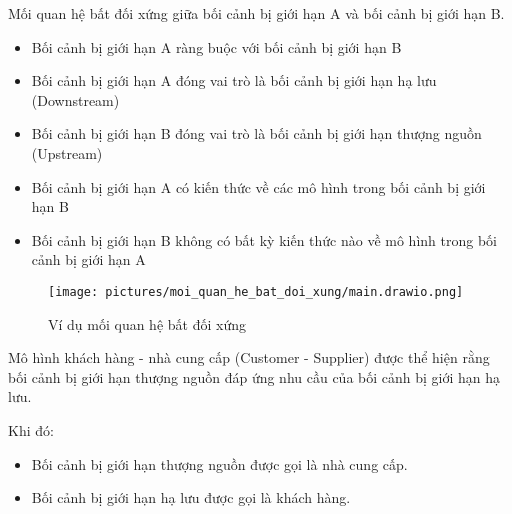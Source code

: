\begin{example} Mối quan hệ bất đối xứng giữa bối cảnh bị giới hạn A và bối cảnh bị giới hạn B.

\begin{itemize}

\item Bối cảnh bị giới hạn A ràng buộc với bối cảnh bị giới hạn B

\item Bối cảnh bị giới hạn A đóng vai trò là bối cảnh bị giới hạn hạ lưu (Downstream)

\item Bối cảnh bị giới hạn B đóng vai trò là bối cảnh bị giới hạn thượng nguồn (Upstream)

\item Bối cảnh bị giới hạn A có kiến thức về các mô hình trong bối cảnh bị giới hạn B

\item Bối cảnh bị giới hạn B không có bất kỳ kiến thức nào về mô hình trong bối cảnh bị giới hạn A

\end{itemize}

\begin{figure}[H]

\centering

\texttt{[image: pictures/moi\_quan\_he\_bat\_doi\_xung/main.drawio.png]}

\caption{Ví dụ mối quan hệ bất đối xứng}

\end{figure}

\end{example}


Mô hình khách hàng - nhà cung cấp (Customer - Supplier) được thể hiện rằng bối cảnh bị giới hạn thượng nguồn đáp ứng nhu cầu của bối cảnh bị giới hạn hạ lưu.

Khi đó:

\begin{itemize}

\item Bối cảnh bị giới hạn thượng nguồn được gọi là nhà cung cấp.

\item Bối cảnh bị giới hạn hạ lưu được gọi là khách hàng.

\end{itemize}

